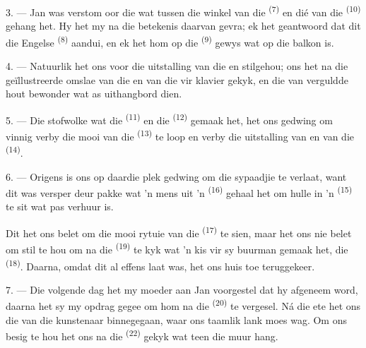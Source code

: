 3. --- Jan was verstom oor die  wat tussen die winkel van die
 \textsuperscript{(7)} en dié van die 
\textsuperscript{(10)} gehang het. Hy het my na die betekenis daarvan gevra; ek het
geantwoord dat dit die Engelse  \textsuperscript{(8)} aandui, en ek het
hom op die  \textsuperscript{(9)} gewys wat op die balkon is.

\VUsaut{3.0mm}

4. --- Natuurlik het ons voor die uitstalling van die 
  en  stilgehou; ons het na die
geïllustreerde omslae van die  en van die  vir
klavier gekyk, en die  van verguldde hout bewonder wat as uithangbord dien.

5. --- Die stofwolke wat die  \textsuperscript{(11)} en die
 \textsuperscript{(12)} gemaak het, het ons gedwing om vinnig verby die
mooi  van die  \textsuperscript{(13)} te
loop en verby die uitstalling van  en  van die
 \textsuperscript{(14)}.

6. --- Origens is ons op daardie plek gedwing om die sypaadjie te verlaat, want dit was
versper deur pakke wat 'n mens uit 'n  \textsuperscript{(16)} gehaal
het om hulle in 'n  \textsuperscript{(15)} te sit wat pas verhuur is.

Dit het ons belet om die mooi rytuie van die  \textsuperscript{(17)}
te sien, maar het ons nie belet om stil te hou om na die 
\textsuperscript{(19)} te kyk wat 'n kis vir sy buurman gemaak het, die
 \textsuperscript{(18)}. Daarna, omdat dit al
effens laat was, het ons huis toe teruggekeer.

\VUsaut{3.0mm}

7. --- Die volgende dag het my moeder aan Jan voorgestel dat hy afgeneem word, daarna het
sy my opdrag gegee om hom na die  \textsuperscript{(20)} te vergesel.
Ná die ete het ons die  van die kunstenaar binnegegaan, waar ons taamlik
lank moes wag. Om ons besig te hou het ons na die 
\textsuperscript{(22)} gekyk wat teen die muur hang.

